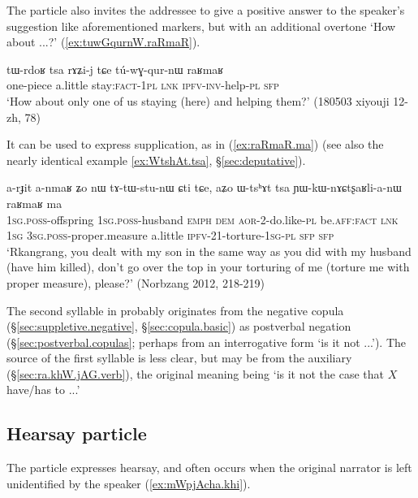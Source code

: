 The particle  also invites the addressee to give a positive answer to the speaker's suggestion like aforementioned markers, but with an additional overtone `How about ...?' (\ref{ex:tuwGqurnW.raRmaR}).

 \begin{exe}
\ex \label{ex:tuwGqurnW.raRmaR}
\gll  tɯ-rdoʁ tsa rɤʑi-j tɕe tú-wɣ-qur-nɯ raʁmaʁ \\
one-piece a.little stay:\textsc{fact}-\textsc{1pl} \textsc{lnk} \textsc{ipfv}-\textsc{inv}-help-\textsc{pl} \textsc{sfp} \\
\glt  `How about only one of us staying (here) and helping them?'  (180503 xiyouji 12-zh, 78)
  \end{exe}
 
It can be used to express supplication, as in  (\ref{ex:raRmaR.ma}) (see also the nearly identical example \ref{ex:WtshAt.tsa}, §\ref{sec:deputative}).

 \begin{exe}
\ex \label{ex:raRmaR.ma}
\gll  a-rɟit a-nmaʁ ʑo nɯ tɤ-tɯ-stu-nɯ ɕti tɕe, aʑo ɯ-tsʰɤt tsa ɲɯ-kɯ-nɤɕtʂaʁli-a-nɯ raʁmaʁ ma \\
\textsc{1sg}.\textsc{poss}-offspring \textsc{1sg}.\textsc{poss}-husband \textsc{emph} \textsc{dem} \textsc{aor}-2-do.like-\textsc{pl} be.\textsc{aff}:\textsc{fact} \textsc{lnk}  \textsc{1sg} \textsc{3sg}.\textsc{poss}-proper.measure a.little \textsc{ipfv}-2\fl{}1-torture-\textsc{1sg}-\textsc{pl} \textsc{sfp} \textsc{sfp}  \\ 
\glt `Rkangrang, you dealt with my son in the same way as you did with my husband (have him killed), don't go over the top in your torturing of me (torture me with proper measure), please?' (Norbzang 2012, 218-219)
  \end{exe}
 
 The second syllable  in   probably originates from the negative copula  (§\ref{sec:suppletive.negative}, §\ref{sec:copula.basic}) as postverbal negation (§\ref{sec:postverbal.copulas}; perhaps from an interrogative form  `is it not ...'). The source of the first syllable  is less clear, but may be from the auxiliary  (§\ref{sec:ra.khW.jAG.verb}), the original meaning being `is it not the case that $X$ have/has to ...'
  
\subsection{Hearsay particle} \label{sec:fsp.hearsay}
The particle  expresses hearsay, and often occurs when the original narrator is left unidentified by the speaker  (\ref{ex:mWpjAcha.khi}).

